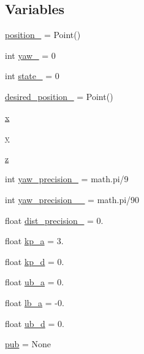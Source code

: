 \subsection*{Variables}
\begin{DoxyCompactItemize}
\item 
\hyperlink{namespacego__to__point_a500520cbcd448f46bf7447a431f61d53}{position\+\_\+} = Point()
\item 
int \hyperlink{namespacego__to__point_ae444f19eb2019982432760ace036ce03}{yaw\+\_\+} = 0
\item 
int \hyperlink{namespacego__to__point_aa2d0ef255bcf5d5faf9ca2764730fb17}{state\+\_\+} = 0
\item 
\hyperlink{namespacego__to__point_a03b48b610dbd224a38eb226c1b2ba23d}{desired\+\_\+position\+\_\+} = Point()
\item 
\hyperlink{namespacego__to__point_a328c9a3bb9322f150f2e67371cd73306}{x}
\item 
\hyperlink{namespacego__to__point_ac372e1a492f9aa66d29f365cc1c57d8c}{y}
\item 
\hyperlink{namespacego__to__point_a2fd68a76b8583598a4bceccdeae5d73b}{z}
\item 
int \hyperlink{namespacego__to__point_a67f95834f0959feb3facd17bc7fa2b38}{yaw\+\_\+precision\+\_\+} = math.\+pi/9
\item 
int \hyperlink{namespacego__to__point_af74ccf49164d0478ca8343e2031d5813}{yaw\+\_\+precision\+\_\+\_\+} = math.\+pi/90
\item 
float \hyperlink{namespacego__to__point_a6a1e4eb20ebd4fce0fc56b0ebfd7a8d5}{dist\+\_\+precision\+\_\+} = 0.
\item 
float \hyperlink{namespacego__to__point_a524106fc7667a0927951dfd89d52d6a7}{kp\+\_\+a} = 3.
\item 
float \hyperlink{namespacego__to__point_a7bc498652ca66932e704e738b50c297b}{kp\+\_\+d} = 0.
\item 
float \hyperlink{namespacego__to__point_acb4e14986fafe5cb73bb8ad0c178869d}{ub\+\_\+a} = 0.
\item 
float \hyperlink{namespacego__to__point_afecad4058844db05d8321199e25b4498}{lb\+\_\+a} = -\/0.
\item 
float \hyperlink{namespacego__to__point_a16c473b9e717200c483d18e66b48152a}{ub\+\_\+d} = 0.
\item 
\hyperlink{namespacego__to__point_a3caa5a6c1e8d7b4854f62a9e35dfad6f}{pub} = None
\end{DoxyCompactItemize}


